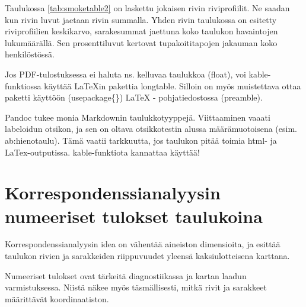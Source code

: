 \documentclass[
  finnish,
]{book}
\newenvironment{Shaded}{\begin{snugshade}}{\end{snugshade}}
\newcommand{\CommentTok}[1]{\textcolor[rgb]{0.56,0.35,0.01}{\textit{#1}}}
\newcommand{\KeywordTok}[1]{\textcolor[rgb]{0.13,0.29,0.53}{\textbf{#1}}}
\newcommand{\NormalTok}[1]{#1}
\newcommand{\StringTok}[1]{\textcolor[rgb]{0.31,0.60,0.02}{#1}}
\begin{document}
Taulukossa \ref{tab:smoketable2} on laskettu jokaisen rivin riviprofiilit. Ne saadan kun rivin luvut jaetaan rivin summalla. Yhden rivin taulukossa on esitetty riviprofiilien keskikarvo, sarakesummat jaettuna koko taulukon havaintojen lukumäärällä. Sen prosenttiluvut kertovat tupakoititapojen jakauman koko henkilöstössä.

Jos PDF-tulostuksessa ei haluta ns. kelluvaa taulukkoa (float), voi kable-funktiossa käyttää LaTeXin pakettia longtable. Silloin on myös muistettava ottaa paketti käyttöön (usepackage\{\}) LaTeX - pohjatiedostossa (preamble).

Pandoc tukee monia Markdownin taulukkotyyppejä. Viittaaminen vaaati labeloidun otsikon, ja sen on oltava otsikkotestin alussa määrämuotoisena (esim. ab:hienotaulu). Tämä vaatii tarkkuutta, jos taulukon pitää toimia html- ja LaTex-outputissa. kable-funktiota kannattaa käyttää!

\hypertarget{korrespondenssianalyysin-numeeriset-tulokset-taulukoina}{%
\section{Korrespondenssianalyysin numeeriset tulokset taulukoina}\label{korrespondenssianalyysin-numeeriset-tulokset-taulukoina}}

Korrespondenssianalyysin idea on vähentää aineiston dimensioita, ja esittää taulukon rivien ja sarakkeiden riippuvuudet yleensä kaksiulotteisena karttana.

Numeeriset tulokset ovat tärkeitä diagnostiikassa ja kartan laadun varmistuksessa. Niistä näkee myös täsmällisesti, mitkä rivit ja sarakkeet määrittävät koordinaatiston.

\begin{Shaded}
\end{Shaded}
\end{document}
